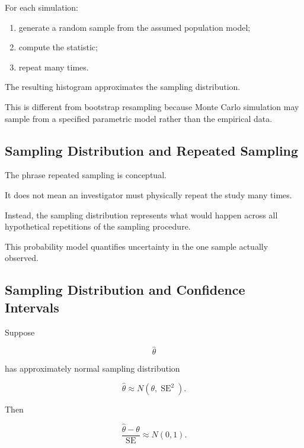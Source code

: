 For each simulation:

\begin{enumerate}
    \item generate a random sample from the assumed population model;
    \item compute the statistic;
    \item repeat many times.
\end{enumerate}

The resulting histogram approximates the sampling distribution.

This is different from bootstrap resampling because Monte Carlo
simulation may sample from a specified parametric model rather than the
empirical data.

\subsection{Sampling Distribution and Repeated Sampling}
\label{subsec:repeated-sampling-interpretation}

The phrase repeated sampling is conceptual.

It does not mean an investigator must physically repeat the study many
times.

Instead, the sampling distribution represents what would happen across
all hypothetical repetitions of the sampling procedure.

This probability model quantifies uncertainty in the one sample actually
observed.

\subsection{Sampling Distribution and Confidence Intervals}
\label{subsec:sampling-confidence-connection}

Suppose

\[
\widehat{\theta}
\]

has approximately normal sampling distribution

\[
\widehat{\theta}
\approx
N
(
\theta,
\operatorname{SE}^2
).
\]

Then

\[
\boxed{
\frac{
\widehat{\theta}-\theta
}{
\operatorname{SE}
}
\approx
N(0,1).
}
\]

